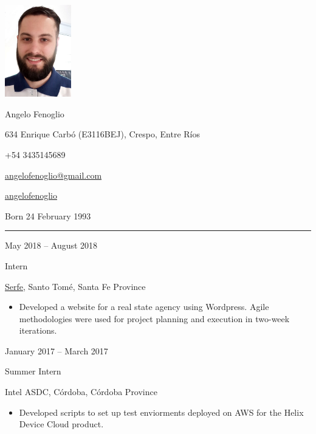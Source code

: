 \documentclass[a4paper,10pt]{article}
\newlength{\cvcolumngapwidth}
\newlength{\cvleftcolumnwidth}
\newlength{\cvrightcolumnwidth}
\newcommand{\cvnamestyle}[1]{{\Huge\cvnamefont\textcolor{cvnamecolor}{#1}}}
\newcommand{\cvsectionstyle}[1]{{\normalsize\cvsectionfont\textcolor{cvsectioncolor}{#1}}}
\newcommand{\cvtitlestyle}[1]{{\large\cvtitlefont\textcolor{cvtitlecolor}{#1}}}
\newcommand{\cvdurationstyle}[1]{{\small\cvdurationfont\textcolor{cvdurationcolor}{#1}}}
\newlength{\cvafteritemskipamount}
\newlength{\cvaftersectionskipamount}
\newlength{\cvafternameskipamount}
\newlength{\cvafterpersonalinfolineskipamount}
\newlength{\cvaftertitleskipamount}
\newlength{\cvparskip}
\newcommand{\cvpersonalinfo}[2]{
    \begin{minipage}[t]{\cvleftcolumnwidth}
        \vspace{0mm} %
        \raggedleft #1
    \end{minipage}%
    \hspace{\cvcolumngapwidth}%
    \begin{minipage}[t]{\cvrightcolumnwidth}
        \vspace{0mm} %
        #2
    \end{minipage}

    \vspace{\cvafteritemskipamount}
}
\newcommand{\cvname}[1]{
    \cvnamestyle{#1}

    \vspace{\cvafternameskipamount}
}
\newcommand{\cvpersonalinfolinewithicon}[3]{
    \raisebox{.5\fontcharht\font`E-.5\height}{\texttt{[image: \#2]}}
    #3

    \vspace{\cvafterpersonalinfolineskipamount}
}
\newcommand{\cvsection}[1]{
    \begin{minipage}[t]{\cvleftcolumnwidth}
        \raggedleft\cvsectionstyle{#1}
    \end{minipage}%
    \hspace{\cvcolumngapwidth}%
    \begin{minipage}[t]{\cvrightcolumnwidth}
        \textcolor{cvrulecolor}{\rule{\cvrightcolumnwidth}{0.3mm}}
    \end{minipage}

    \vspace{\cvaftersectionskipamount}
}
\newcommand{\cvitem}[2]{
    \begin{minipage}[t]{\cvleftcolumnwidth}
        \raggedleft #1
    \end{minipage}%
    \hspace{\cvcolumngapwidth}%
    \begin{minipage}[t]{\cvrightcolumnwidth}
        \setlength{\parskip}{\cvparskip} #2
    \end{minipage}

    \vspace{\cvafteritemskipamount}
}
\newcommand{\cvtitle}[1]{
    \cvtitlestyle{#1}

    \vspace{\cvaftertitleskipamount}
    \vspace{-\cvparskip}
}
\begin{document}

\cvpersonalinfo{
    \includegraphics[height=40mm]{cvphoto.png}
}{
    \cvname{Angelo Fenoglio}

    \cvpersonalinfolinewithicon{height=4mm}{072-location.pdf}{
        634 Enrique Carbó (E3116BEJ), Crespo, Entre Ríos
    }

    \cvpersonalinfolinewithicon{height=4mm}{067-phone.pdf}{
        +54 3435145689
    }

    \cvpersonalinfolinewithicon{height=4mm}{070-envelop.pdf}{
        \href{mailto:angelofenoglio@gmail.com}{angelofenoglio@gmail.com}
    }

    \cvpersonalinfolinewithicon{height=4mm}{458-linkedin.pdf}{
        \href{https://www.linkedin.com/in/angelofenoglio/}{angelofenoglio}
    }

    Born 24 February 1993
}



\cvsection{WORK EXPERIENCE}

\cvitem{
    \cvdurationstyle{May 2018 -- August 2018}
}{
    \cvtitle{Intern}

    \href{https://www.serfe.com/en/}{Serfe}, Santo Tomé, Santa Fe Province

    \begin{itemize}[leftmargin=*]
        \item Developed a website for a real state agency using Wordpress. Agile methodologies were used for project planning and execution in two-week iterations.
    \end{itemize}
}

\cvitem{
    \cvdurationstyle{January 2017 -- March 2017}
}{
    \cvtitle{Summer Intern}

    Intel ASDC, Córdoba, Córdoba Province

    \begin{itemize}[leftmargin=*]
        \item Developed scripts to set up test enviorments deployed on AWS for the Helix Device Cloud product. 
    \end{itemize}
}
\end{document}
